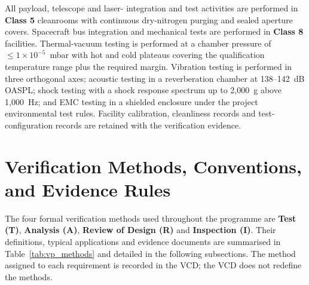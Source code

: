 All payload, telescope and laser- integration and test activities are performed in \textbf{Class 5} cleanrooms with continuous dry-nitrogen purging and sealed aperture covers. Spacecraft bus integration and mechanical tests are performed in \textbf{Class 8} facilities. Thermal-vacuum testing is performed at a chamber pressure of $\le 1\times10^{-5}$~mbar with hot and cold plateaus covering the qualification temperature range plus the required margin. Vibration testing is performed in three orthogonal axes; acoustic testing in a reverberation chamber at 138--142~dB OASPL; shock testing with a shock response spectrum up to 2,000~g above 1,000~Hz; and EMC testing in a shielded enclosure under the project environmental test rules. Facility calibration, cleanliness records and test-configuration records are retained with the verification evidence.

\section{Verification Methods, Conventions, and Evidence Rules}

The four formal verification methods used throughout the programme are \textbf{Test (T)}, \textbf{Analysis (A)}, \textbf{Review of Design (R)} and \textbf{Inspection (I)}. Their definitions, typical applications and evidence documents are summarised in Table~\ref{tab:vp_methods} and detailed in the following subsections. The method assigned to each requirement is recorded in the VCD; the VCD does not redefine the methods.

